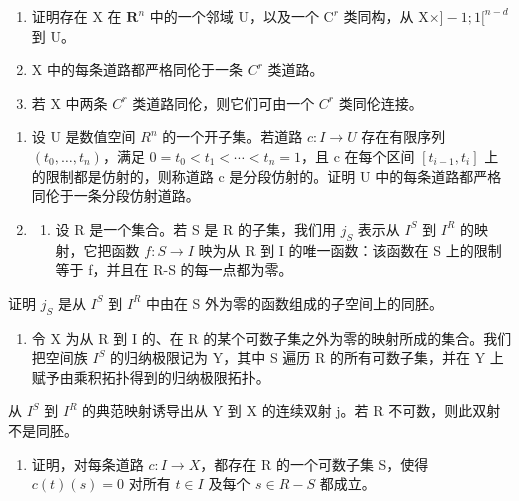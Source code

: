 \begin{enumerate}
\def\labelenumi{\alph{enumi})}
\item
  证明存在 X 在 \(\mathbf{R}^n\) 中的一个邻域 U，以及一个 \(\mathrm{C}^r\) 类同构，从 \(\mathrm{X} \times ] - 1; 1[^{n - d}\) 到 \(\mathrm{U}\)。
\item
  X 中的每条道路都严格同伦于一条 \(C^{r}\) 类道路。
\item
  若 X 中两条 \(C^{r}\) 类道路同伦，则它们可由一个 \(C^{r}\) 类同伦连接。
\end{enumerate}

\begin{enumerate}
\def\labelenumi{\arabic{enumi})}
\setcounter{enumi}{5}
\item
  设 U 是数值空间 \(R^{n}\) 的一个开子集。若道路 \(c: I \to U\) 存在有限序列 \((t_{0}, \ldots, t_{n})\)，满足 \(0 = t_{0} < t_{1} < \cdots < t_{n} = 1\)，且 c 在每个区间 \([t_{i-1}, t_{i}]\) 上的限制都是仿射的，则称道路 c 是分段仿射的。证明 U 中的每条道路都严格同伦于一条分段仿射道路。
\item
  \begin{enumerate}
  \def\labelenumii{\alph{enumii})}
  \tightlist
  \item
    设 R 是一个集合。若 S 是 R 的子集，我们用 \(j_{S}\) 表示从 \(I^{S}\) 到 \(I^{R}\) 的映射，它把函数 \(f: S \to I\) 映为从 R 到 I 的唯一函数：该函数在 S 上的限制等于 f，并且在 R-S 的每一点都为零。
  \end{enumerate}
\end{enumerate}

证明 \(j_{S}\) 是从 \(I^{S}\) 到 \(I^{R}\) 中由在 S 外为零的函数组成的子空间上的同胚。

\begin{enumerate}
\def\labelenumi{\alph{enumi})}
\setcounter{enumi}{1}
\tightlist
\item
  令 X 为从 R 到 I 的、在 R 的某个可数子集之外为零的映射所成的集合。我们把空间族 \(I^{S}\) 的归纳极限记为 Y，其中 S 遍历 R 的所有可数子集，并在 Y 上赋予由乘积拓扑得到的归纳极限拓扑。
\end{enumerate}

从 \(I^{S}\) 到 \(I^{R}\) 的典范映射诱导出从 Y 到 X 的连续双射 j。若 R 不可数，则此双射不是同胚。

\begin{enumerate}
\def\labelenumi{\alph{enumi})}
\setcounter{enumi}{2}
\tightlist
\item
  证明，对每条道路 \(c: I \to X\)，都存在 R 的一个可数子集 S，使得 \(c(t)(s) = 0\) 对所有 \(t \in I\) 及每个 \(s \in R - S\) 都成立。
\end{enumerate}

